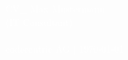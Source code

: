 \newcommand{\cccvname}{Max Mustermann}
\newcommand{\cccvjobtitle}{IT Consultant}

\NoBgThispage
\AddToShipoutPicture*{\BackgroundPic}
\vspace*{18.5cm}
\noindent
\textcolor{white}{
{\Huge CV\_ \cccvname}\\[8pt]
{\huge (\cccvjobtitle)}\\
\\[8pt]
{\Large codecentric AG | \today}
}

